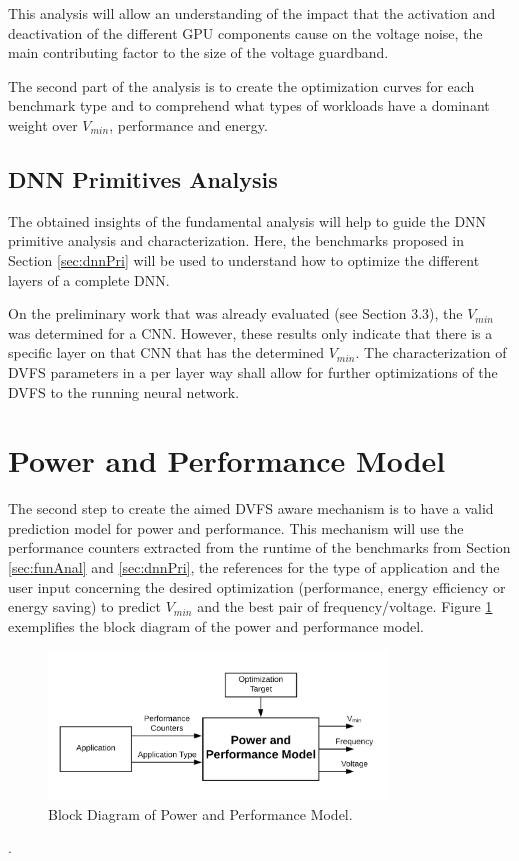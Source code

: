 This analysis will allow an understanding of the impact that the activation and deactivation of the different GPU components cause on the voltage noise, the main contributing factor to the size of the voltage guardband.

The second part of the analysis is to create the optimization curves for each benchmark type and to comprehend what types of workloads have a dominant weight over $V_{min}$, performance and energy.


\subsection{DNN Primitives Analysis}
The obtained insights of the fundamental analysis will help to guide the DNN primitive analysis and characterization. Here, the benchmarks proposed in Section \ref{sec:dnnPri} will be used to understand how to optimize the different layers of a complete DNN. 

On the preliminary work that was already evaluated (see Section 3.3), the $V_{min}$ was determined for a CNN. However, these results only indicate that there is a specific layer on that CNN that has the determined  $V_{min}$. The characterization of DVFS parameters in a per layer way shall allow for further optimizations of the DVFS to the running neural network.

\section{Power and Performance Model}
The second step to create the aimed DVFS aware mechanism is to have a valid prediction model for power and performance. This mechanism will use the performance counters extracted from the runtime of the benchmarks from Section \ref{sec:funAnal} and \ref{sec:dnnPri}, the references for the type of application and the user input concerning the desired optimization (performance, energy efficiency or energy saving) to predict $V_{min}$ and the best pair of frequency/voltage. Figure \ref{fig:model} exemplifies the block diagram of the power and performance model.

\begin{figure}[!htb]
  \centering
  \includegraphics[width=0.8\textwidth]{Figures/Proposel/model.png}
  \caption[Controller]{Block Diagram of Power and Performance Model.}
  \label{fig:model}
\end{figure}. 

